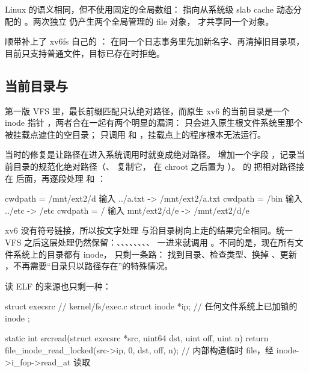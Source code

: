Linux 的语义相同，但不使用固定的全局数组： 指向从系统级 slab cache 动态分配的 。两次独立  仍产生两个全局管理的 file 对象， 才共享同一个对象。

顺带补上了 xv6fs 自己的 ： 在同一个日志事务里先加新名字、再清掉旧目录项，目前只支持普通文件，目标已存在时拒绝。

\subsection{当前目录与 }
\label{sec:vfs-cwd}

第一版 VFS 里，最长前缀匹配只认绝对路径，而原生 xv6 的当前目录是一个 inode 指针 ，两者合在一起有两个明显的漏洞： 只会进入原生根文件系统里那个被挂载点遮住的空目录； 只调用  和 ，挂载点上的程序根本无法运行。

当时的修复是让路径在进入系统调用时就变成绝对路径。 增加一个字段 ，记录当前目录的规范化绝对路径（、 复制它， 在 chroot 之后置为 \code{/}）。 的  把相对路径接在  后面，再逐段处理  和 ：

\begin{txtcode}
cwdpath = /mnt/ext2/d      输入 ../a.txt     ->  /mnt/ext2/a.txt
cwdpath = /bin             输入 ../etc       ->  /etc
cwdpath = /                输入 mnt/ext2/d/e ->  /mnt/ext2/d/e
\end{txtcode}

xv6 没有符号链接，所以按文字处理  与沿目录树向上走的结果完全相同。统一 VFS 之后这层处理仍然保留：、、、、、、、、 一进来就调用 。不同的是，现在所有文件系统上的目录都有 inode， 只剩一条路： 找到目录、检查类型、换掉 、更新 ，不再需要“目录只以路径存在”的特殊情况。

 读 ELF 的来源也只剩一种：

\begin{ccode}
struct execsrc {                 // kernel/fs/exec.c
  struct inode *ip;              // 任何文件系统上已加锁的 inode
};

static int srcread(struct execsrc *src, uint64 dst, uint off, uint n) {
  return file_inode_read_locked(src->ip, 0, dst, off, n);
  // 内部构造临时 file，经 inode->i_fop->read_at 读取
}
\end{ccode}

